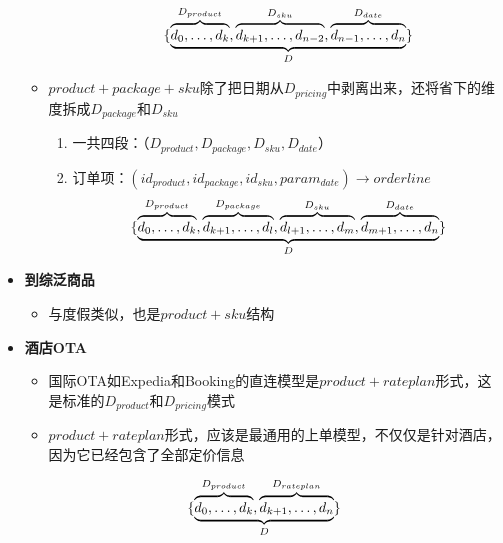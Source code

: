 \documentclass[a4paper]{article}
\begin{document}
\begin{itemize}
\begin{itemize}
\begin{enumerate}
                \begin{equation}
                    \{\underbrace{%
                        \overbrace{\mathstrut d_0,\ldots,d_k}^{D_{product}},
                        \overbrace{\mathstrut d_{k+1},\ldots,d_{n-2}}^{D_{sku}},
                        \overbrace{\mathstrut d_{n-1},\ldots,d_n}^{D_{date}}
                    }
                    _{D} \}
                \end{equation}                        
            \end{enumerate}
            \item $product+package+sku$除了把日期从$D_{pricing}$中剥离出来，还将省下的维度拆成$D_{package}$和$D_{sku}$
            \begin{enumerate}      
                \item 一共四段：（$D_{product}, D_{package}, D_{sku}, D_{date}$）
                \item 订单项：$(id_{product}, id_{package}, id_{sku}, param_{date}) \longrightarrow orderline$ 
                \begin{equation}
                    \{\underbrace{%
                        \overbrace{\mathstrut d_0,\ldots,d_k}^{D_{product}},
                        \overbrace{\mathstrut d_{k+1},\ldots,d_l}^{D_{package}},                        
                        \overbrace{\mathstrut d_{l+1},\ldots,d_m}^{D_{sku}},
                        \overbrace{\mathstrut d_{m+1},\ldots,d_n}^{D_{date}}
                    }
                    _{D} \}
                \end{equation}  
            \end{enumerate}
        \end{itemize}
    \item \textbf{到综泛商品}
        \begin{itemize}
            \item 与度假类似，也是$product+sku$结构
        \end{itemize}
    \item \textbf{酒店OTA}
        \begin{itemize}
            \item 国际OTA如Expedia和Booking的直连模型是$product+rateplan$形式，这是标准的$D_{product}$和$D_{pricing}$模式
            \item $product+rateplan$形式，应该是最通用的上单模型，不仅仅是针对酒店，因为它已经包含了全部定价信息
        \end{itemize}
        \begin{equation}
            \{\underbrace{%
                \overbrace{\mathstrut d_0,\ldots,d_k}^{D_{product}},
                \overbrace{\mathstrut d_{k+1},\ldots,d_n}^{D_{rateplan}}
            }
            _{D} \}
        \end{equation}
\end{itemize}
\end{document}
